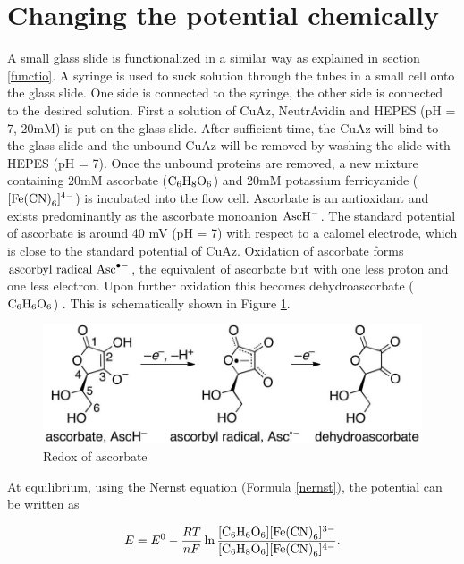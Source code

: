 \documentclass[twoside,single]{lion-msc}
\begin{document}
\section{Changing the potential chemically}\label{pot_chem}

A small glass slide is functionalized in a similar way as explained in section \ref{functio}. A syringe is used to suck solution through the tubes in a small cell onto the glass slide. One side is connected to the syringe, the other side is connected to the desired solution. First a solution of CuAz, NeutrAvidin and HEPES (pH = 7, 20mM) is put on the glass slide. After sufficient time, the CuAz will bind to the glass slide and the unbound CuAz will be removed by washing the slide with HEPES (pH = 7). Once the unbound proteins are removed, a new mixture containing 20mM ascorbate ($\textup{C}_{6}\textup{H}_{8}\textup{O}_{6}$) and 20mM potassium ferricyanide ($[\textup{Fe(CN)}_{6}]^{4-}$) is incubated into the flow cell. Ascorbate is an antioxidant and exists predominantly as the ascorbate monoanion  $\textup{AscH}^{-}$. The standard potential of ascorbate is around 40 mV (pH = 7) \cite{Creutz1981} with respect to a calomel electrode, which is close to the standard potential of CuAz. Oxidation of ascorbate forms $\textup{ascorbyl radical Asc}^{\bullet  -}$, the equivalent of ascorbate but with one less proton and one less electron. Upon further oxidation this becomes dehydroascorbate ($\textup{C}_{6}\textup{H}_{6}\textup{O}_{6}$) \cite{Warren2010}. This is schematically shown in Figure \ref{redox_asc}.

\begin{figure}[ht!]
\centering
\includegraphics[width=\textwidth]{redox_asc}
\caption{Redox of ascorbate}
\label{redox_asc}
\end{figure}

At equilibrium, using the Nernst equation (Formula \ref{nernst}), the potential can be written as

\begin{equation}
E = E^{0} - \frac{RT}{nF} \ln \frac{[\textup{C}_{6}\textup{H}_{6}\textup{O}_{6}][\textup{Fe(CN)}_{6}]^{3-}}{[\textup{C}_{6}\textup{H}_{8}\textup{O}_{6}][\textup{Fe(CN)}_{6}]^{4-}}.
\end{equation}
\end{document}
